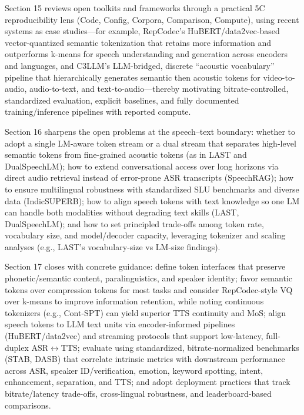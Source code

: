 \documentclass{article}
\begin{document}
Section 15 reviews open toolkits and frameworks through a practical 5C reproducibility lens (Code, Config, Corpora, Comparison, Compute), using recent systems as case studies---for example, RepCodec's HuBERT/data2vec-based vector-quantized semantic tokenization that retains more information and outperforms k-means for speech understanding and generation across encoders and languages, and C3LLM's LLM-bridged, discrete ``acoustic vocabulary'' pipeline that hierarchically generates semantic then acoustic tokens for video-to-audio, audio-to-text, and text-to-audio---thereby motivating bitrate-controlled, standardized evaluation, explicit baselines, and fully documented training/inference pipelines with reported compute. \cite{wang2024c3llmconditionalmultimodalcontentgenerat,huang2024repcodecspeechrepresentationcodectokeniz} 



Section 16 sharpens the open problems at the speech--text boundary: whether to adopt a single LM-aware token stream or a dual stream that separates high-level semantic tokens from fine-grained acoustic tokens (as in LAST and DualSpeechLM); how to extend conversational access over long horizons via direct audio retrieval instead of error-prone ASR transcripts (SpeechRAG); how to ensure multilingual robustness with standardized SLU benchmarks and diverse data (IndicSUPERB); how to align speech tokens with text knowledge so one LM can handle both modalities without degrading text skills (LAST, DualSpeechLM); and how to set principled trade-offs among token rate, vocabulary size, and model/decoder capacity, leveraging tokenizer and scaling analyses (e.g., LAST's vocabulary-size vs LM-size findings). \cite{min2025speechretrievalaugmentedgenerationwithou,turetzky2024lastlanguagemodelawarespeechtokenization,wang2025dualspeechlmtowardsunifiedspeechundersta,entry2025indicsuperbspeechprocessinguniversalperf} 



Section 17 closes with concrete guidance: define token interfaces that preserve phonetic/semantic content, paralinguistics, and speaker identity; favor semantic tokens over compression tokens for most tasks and consider RepCodec-style VQ over k-means to improve information retention, while noting continuous tokenizers (e.g., Cont-SPT) can yield superior TTS continuity and MoS; align speech tokens to LLM text units via encoder-informed pipelines (HuBERT/data2vec) and streaming protocols that support low-latency, full-duplex ASR$\leftrightarrow$TTS; evaluate using standardized, bitrate-normalized benchmarks (STAB, DASB) that correlate intrinsic metrics with downstream performance across ASR, speaker ID/verification, emotion, keyword spotting, intent, enhancement, separation, and TTS; and adopt deployment practices that track bitrate/latency trade-offs, cross-lingual robustness, and leaderboard-based comparisons. \cite{li2025continuousspeechtokenizertext,mousavi2024dasbdiscreteaudiospeechbenchmark,vashishth2024stabspeechtokenizerassessmentbenchmark,huang2024repcodecspeechrepresentationcodectokeniz}
\end{document}
